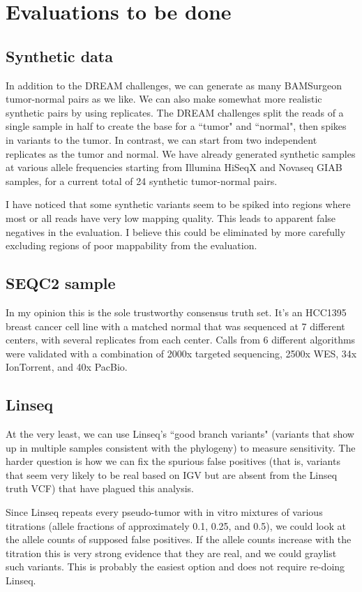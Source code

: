 \documentclass[times, twoside, watermark]{StyleBioRxiv}
\begin{document}
\section*{Evaluations to be done}
\subsection*{Synthetic data}
In addition to the DREAM challenges, we can generate as many BAMSurgeon tumor-normal pairs as we like.  We can also make somewhat more realistic synthetic pairs by using replicates.  The DREAM challenges split the reads of a single sample in half to create the base for a ``tumor" and ``normal", then spikes in variants to the tumor.  In contrast, we can start from two independent replicates as the tumor and normal.  We have already generated synthetic samples at various allele frequencies starting from Illumina HiSeqX and Novaseq GIAB samples, for a current total of 24 synthetic tumor-normal pairs.

I have noticed that some synthetic variants seem to be spiked into regions where most or all reads have very low mapping quality.  This leads to apparent false negatives in the evaluation.  I believe this could be eliminated by more carefully excluding regions of poor mappability from the evaluation.

\subsection*{SEQC2 sample}
In my opinion this is the sole trustworthy consensus truth set.  It's an HCC1395 breast cancer cell line with a matched normal that was sequenced at 7 different centers, with several replicates from each center.  Calls from 6 different algorithms were validated with a combination of 2000x targeted sequencing, 2500x WES, 34x IonTorrent, and 40x PacBio.

\subsection*{Linseq}
At the very least, we can use Linseq's ``good branch variants" (variants that show up in multiple samples consistent with the phylogeny) to measure sensitivity.  The harder question is how we can fix the spurious false positives (that is, variants that seem very likely to be real based on IGV but are absent from the Linseq truth VCF) that have plagued this analysis.

Since Linseq repeats every pseudo-tumor with in vitro mixtures of various titrations (allele fractions of approximately 0.1, 0.25, and 0.5), we could look at the allele counts of supposed false positives.  If the allele counts increase with the titration this is very strong evidence that they are real, and we could graylist such variants.  This is probably the easiest option and does not require re-doing Linseq.
\end{document}
